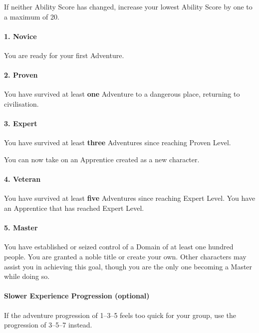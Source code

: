 \documentclass[itdr]{subfiles}
\begin{document}
If neither Ability Score has changed, increase your lowest Ability Score by one to a maximum of 20.

\vfill
\paragraph{1. Novice}
You are ready for your first Adventure.

\vfill
\paragraph{2. Proven}
You have survived at least \textbf{one} Adventure to a dangerous place, returning to civilisation.

\vfill
\paragraph{3. Expert}
You have survived at least \textbf{three} Adventures since reaching Proven Level.

You can now take on an Apprentice created as a new character.

\vfill
\paragraph{4. Veteran}
You have survived at least \textbf{five} Adventures since reaching Expert Level. You have an Apprentice that has reached Expert Level.

\vfill
\paragraph{5. Master}
You have established or seized control of a Domain of at least one hundred people. You are granted a noble title or create your own. Other characters may assist you in achieving this goal, though you are the only one becoming a Master while doing so.

\vfill

\begin{dbox}
	\paragraph{Slower Experience Progression (optional)}
	If the adventure progression of 1--3--5 feels too quick for your group, use the progression of 3--5--7 instead.
\end{dbox}

\vfill
\end{document}
